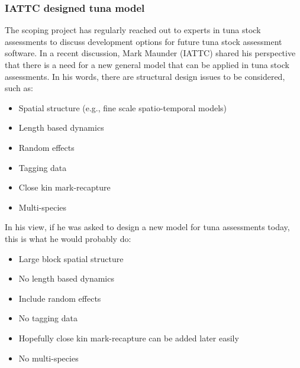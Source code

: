 \documentclass{SCreport}
\begin{document}
\newpage

\subsubsection{IATTC designed tuna model}

The scoping project has regularly reached out to experts in tuna stock
assessments to discuss development options for future tuna stock assessment
software. In a recent discussion, Mark Maunder (IATTC) shared his perspective
that there is a need for a new general model that can be applied in tuna stock
assessments. In his words, there are structural design issues to be considered,
such as:

\begin{itemize}
  \item Spatial structure (e.g., fine scale spatio-temporal models)\\[-4ex]
  \item Length based dynamics\\[-4ex]
  \item Random effects\\[-4ex]
  \item Tagging data\\[-4ex]
  \item Close kin mark-recapture\\[-4ex]
  \item Multi-species
\end{itemize}

\vspace{2ex}

In his view, if he was asked to design a new model for tuna assessments today,
this is what he would probably do:

\begin{itemize}
  \item Large block spatial structure\\[-4ex]
  \item No length based dynamics\\[-4ex]
  \item Include random effects\\[-4ex]
  \item No tagging data\\[-4ex]
  \item Hopefully close kin mark-recapture can be added later easily\\[-4ex]
  \item No multi-species
\end{itemize}
\end{document}
